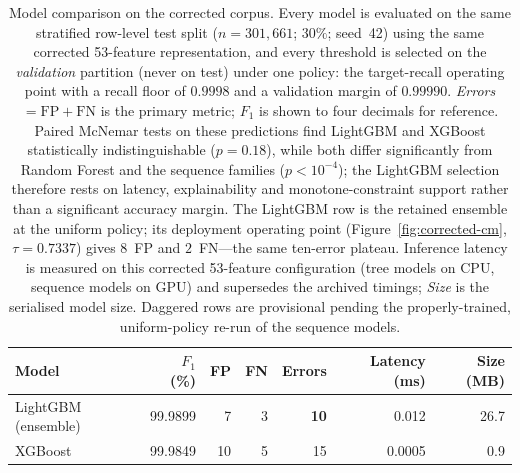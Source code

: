 %
\begin{table}[htbp]
\centering
\caption[Corrected-corpus model comparison]{%
Model comparison on the corrected corpus. Every model is evaluated on the same
stratified row-level test split ($n=301{,}661$; $30\%$; seed~42) using the same
corrected 53-feature representation, and every threshold is selected on the
\emph{validation} partition (never on test) under one policy: the
target-recall operating point with a recall floor of $0.9998$ and a validation
margin of $0.99990$. \emph{Errors} $=\mathrm{FP}+\mathrm{FN}$ is the primary
metric; $F_1$ is shown to four decimals for reference. Paired McNemar tests on
these predictions find LightGBM and XGBoost statistically indistinguishable
($p=0.18$), while both differ significantly from Random Forest and the sequence
families ($p<10^{-4}$); the LightGBM selection therefore rests on latency,
explainability and monotone-constraint support rather than a significant
accuracy margin. The LightGBM row is the retained ensemble at the uniform
policy; its deployment operating point (Figure~\ref{fig:corrected-cm},
$\tau=0.7337$) gives $8$~FP and $2$~FN---the same ten-error plateau. Inference
latency is measured on this corrected 53-feature configuration (tree models on
CPU, sequence models on GPU) and supersedes the archived timings; \emph{Size} is
the serialised model size. Daggered rows are provisional pending the
properly-trained, uniform-policy re-run of the sequence models.}
\label{tab:corrected-model-comparison}
\begin{tabular}{lrrrrrr}
\toprule
Model & $F_1$ (\%) & FP & FN & Errors & Latency (ms) & Size (MB)\\
\midrule
LightGBM (ensemble)      & 99.9899 & 7    & 3   & \textbf{10} & 0.012  & 26.7\\
XGBoost                  & 99.9849 & 10   & 5   & 15          & 0.0005 & 0.9\\

\end{tabular}
\end{table}
